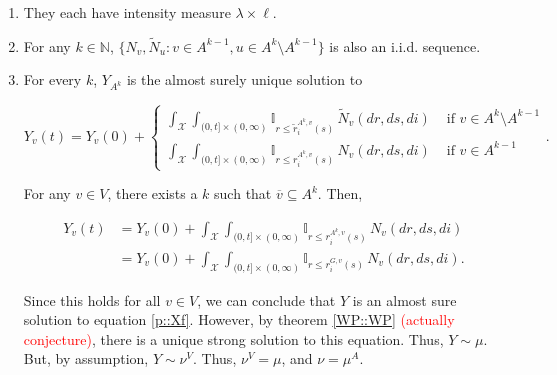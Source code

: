 \documentclass[12pt]{article}
\newcommand{\mb}{\mathbb}
\newcommand{\mc}{\mathcal}
\newcommand{\ov}{\overline}
\newcommand{\te}{\text}
\newcommand{\tr}{\textcolor{red}}
\newcommand{\sta}{\mc{X}}							%
\newcommand{\cl}[1]{\ov{#1}}						%
\newcommand{\indx}[1]{^{#1}}						%
\newcommand{\Xf}{X}									%
\newcommand{\poiss}{N}								%
\newcommand{\leb}{\lambda}							%
\newcommand{\Sm}{\ell}								%
\newcommand{\rate}{r}								%
\newcommand{\m}{\mu}								%
\newcommand{\poissv}[1]{_{#1}}						%
\newcommand{\vind}[1]{_{#1}}						%
\newcommand{\tme}[1]{(#1)}							%
\newcommand{\vpara}[1]{^{#1}}						%
\newcommand{\stpara}[1]{_{#1}}						%
\newcommand{\gvpara}[2]{^{#1,#2}}					%
\newcommand{\Xg}{Y}									%
\newcommand{\brate}{\alt{\rate}}					%
\newcommand{\alt}[1]{\tilde{#1}}					%
\newcommand{\mm}{\nu}								%
\begin{document}
\begin{enumerate}
\item They each have intensity measure \(\leb\times\Sm\).

\item For any \(k \in \mb{N}\), \(\{\poiss\poissv{v},\alt{\poiss}\poissv{u}: v \in A\indx{k-1},u\in A\indx{k}\setminus A\indx{k-1}\}\) is also an i.i.d. sequence.

\item For every \(k\), \(\Xg\vind{A\indx{k}}\) is the almost surely unique solution to 

\begin{equation}
\Xg\vind{v}\tme{t} = \Xg\vind{v}\tme{0} + 
\begin{cases}
\int_\sta\int_{(0,t]\times(0,\infty)} \mb{I}_{r \leq \brate\gvpara{A\indx{k}}{v}\stpara{i}\tme{s}}\,\alt{\poiss}\poissv{v}(dr,ds,di)& \te{ if } v \in A\indx{k}\setminus A\indx{k-1}\\
\int_\sta\int_{(0,t]\times(0,\infty)} \mb{I}_{r \leq \rate\gvpara{A\indx{k}}{v}\stpara{i}\tme{s}}\,\poiss\poissv{v}(dr,ds,di)&\te{ if } v \in A\indx{k-1}
\end{cases}.
\label{Uq::extcomb}
\end{equation}

For any \(v \in V\), there exists a \(k\) such that \(\cl{v}\subseteq A\indx{k}\). Then,

\begin{align*}
\Xg\vind{v}\tme{t} &= \Xg\vind{v}\tme{0} + \int_\sta\int_{(0,t]\times(0,\infty)} \mb{I}_{r \leq \rate\gvpara{A\indx{k}}{v}\stpara{i}\tme{s}}\,\poiss\poissv{v}(dr,ds,di)\\
&=\Xg\vind{v}\tme{0} + \int_\sta\int_{(0,t]\times(0,\infty)} \mb{I}_{r \leq \rate\gvpara{G}{v}\stpara{i}\tme{s}}\,\poiss\poissv{v}(dr,ds,di).
\end{align*}

Since this holds for all \(v \in V\), we can conclude that \(\Xg\) is an almost sure solution to equation \eqref{p::Xf}. However, by theorem \ref{WP::WP} \tr{(actually conjecture)}, there is a unique strong solution to this equation. Thus, \(\Xg \sim \m\). But, by assumption, \(\Xg\sim \mm\vpara{V}\). Thus, \(\mm\vpara{V} = \m\), and \(\mm = \m\vpara{A}\).
\end{enumerate}

\newpage


\end{document}
